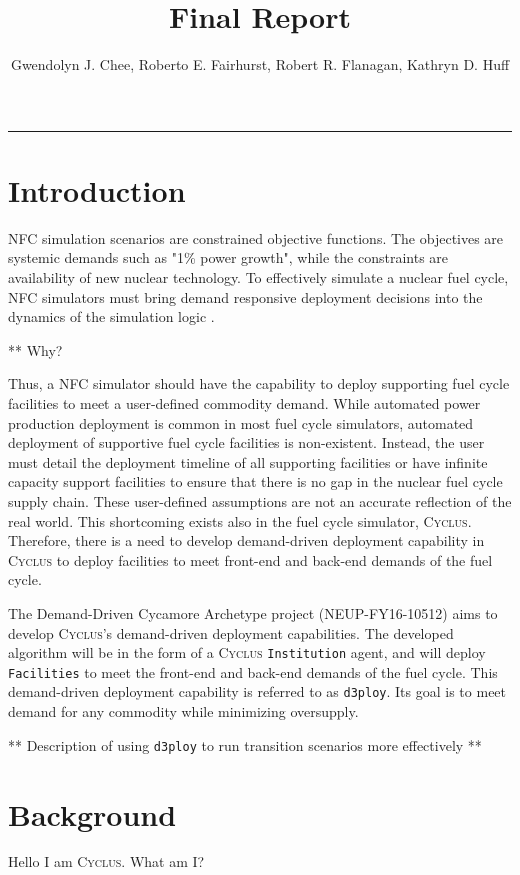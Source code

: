 \documentclass[11pt,letterpaper]{article}
\title{Final Report}
\author{Gwendolyn J. Chee, Roberto E. Fairhurst, Robert R. Flanagan, Kathryn D. Huff}
\newcommand{\Cyclus}{\textsc{Cyclus}\xspace}%
\newcommand{\deploy}{\texttt{d3ploy}\xspace}%
\begin{document}
	\maketitle
	\hrule


\section{Introduction}
\gls{NFC} simulation scenarios are constrained objective functions. 
The objectives are systemic demands such as "1\% power growth", 
while the constraints are availability of new nuclear technology.
To effectively simulate a nuclear fuel cycle, \gls{NFC} simulators 
must bring demand responsive deployment decisions into the dynamics
of the simulation logic \cite{huff_current_2017}. 

** Why? 

Thus, a \gls{NFC} simulator should have the capability to deploy 
supporting fuel cycle facilities to meet a user-defined commodity
demand. 
While automated power production deployment is common in most fuel
cycle simulators, automated deployment of supportive fuel cycle 
facilities is non-existent. 
Instead, the user must detail the deployment timeline of all 
supporting facilities or have infinite capacity support facilities
to ensure that there is no gap in the nuclear fuel cycle supply 
chain. 
These user-defined assumptions are not an accurate reflection 
of the real world. 
This shortcoming exists also in the fuel cycle simulator, \Cyclus. 
Therefore, there is a need to develop demand-driven deployment 
capability in \Cyclus to deploy facilities to meet front-end and 
back-end demands of the fuel cycle.

The Demand-Driven Cycamore Archetype project (NEUP-FY16-10512) 
aims to develop \Cyclus's demand-driven deployment capabilities. 
The developed algorithm will be in the form of a \Cyclus 
\texttt{Institution} agent, and will deploy \texttt{Facilities} 
to meet the front-end and back-end demands of the fuel cycle.
This demand-driven deployment capability is referred to as 
\deploy. 
Its goal is to meet demand for any commodity while minimizing 
oversupply. 

** Description of using \deploy to run transition scenarios more effectively ** 

\section{Background}
Hello I am \Cyclus. What am I? 
\end{document}
